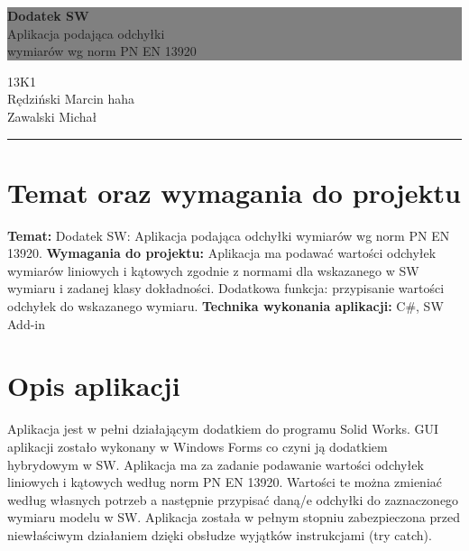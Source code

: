 \documentclass[11pt,a4paper]{article}
\newcommand{\HRule}[1]{\hfill \rule{0.2\linewidth}{#1}}
\begin{document}
\colorbox{grey}{
	\parbox[t]{1.0\linewidth}{
		\centering \fontsize{30pt}{40pt}\selectfont %
		\vspace*{0.7cm} 
		
		\hfill \textbf{Dodatek SW} \\
		\hfill Aplikacja podająca odchyłki \\
		\hfill wymiarów wg norm PN EN 13920 \par
		
		\vspace*{0.7cm} %
	}
}
\vfill
{\centering \large 
\hfill 13K1 \\
\hfill Rędziński Marcin haha \\
\hfill Zawalski Michał \\
\HRule{1pt}} %

\newpage
\tableofcontents
\newpage
\section{Temat oraz wymagania do projektu}

\textbf{Temat: } Dodatek SW: Aplikacja podająca odchyłki wymiarów wg norm PN EN
13920.
\newline
\newline
\textbf{Wymagania do projektu: } Aplikacja ma podawać wartości odchyłek wymiarów
liniowych i kątowych zgodnie z normami dla wskazanego w SW wymiaru i
zadanej klasy dokładności. Dodatkowa funkcja: przypisanie wartości odchyłek
do wskazanego wymiaru.
\newline
\newline
\textbf{Technika wykonania aplikacji: } C\#, SW Add-in

\section{Opis aplikacji}

Aplikacja jest w pełni działającym dodatkiem do programu Solid Works. GUI aplikacji zostało wykonany w Windows Forms co czyni ją dodatkiem hybrydowym w SW. Aplikacja ma za zadanie podawanie wartości odchyłek liniowych i kątowych według norm PN EN 13920. Wartości te można zmieniać według własnych potrzeb a następnie przypisać daną/e odchyłki do zaznaczonego wymiaru modelu w SW. Aplikacja została w pełnym stopniu zabezpieczona przed niewłaściwym działaniem dzięki obsłudze wyjątków instrukcjami (try catch). 
\end{document}
